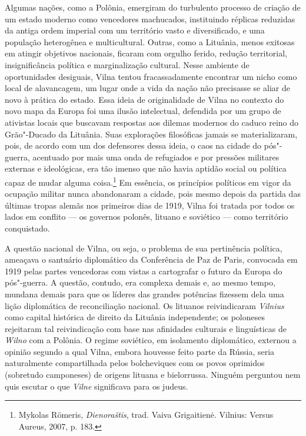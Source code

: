 Algumas nações, como a Polônia, emergiram do turbulento processo de
criação de um estado moderno como vencedores machucados, instituindo
réplicas reduzidas da antiga ordem imperial com um território vasto e
diversificado, e uma população heterogênea e multicultural. Outras, como
a Lituânia, menos exitosas em atingir objetivos nacionais, ficaram com
orgulho ferido, redução territorial, insignificância política e
marginalização cultural. Nesse ambiente de oportunidades desiguais,
Vilna tentou fracassadamente encontrar um nicho como local de
alavancagem, um lugar onde a vida da nação não precisasse se aliar de
novo à prática do estado. Essa ideia de originalidade de Vilna no
contexto do novo mapa da Europa foi uma ilusão intelectual, defendida
por um grupo de ativistas locais que buscavam respostas aos dilemas
modernos do caduco reino do Grão"-Ducado da Lituânia. Suas explorações
filosóficas jamais se materializaram, pois, de acordo com um dos
defensores dessa ideia, o caos na cidade do pós"-guerra, acentuado por
mais uma onda de refugiados e por pressões militares externas e
ideológicas, era tão imenso que não havia aptidão social ou política
capaz de mudar alguma coisa.\footnote{Mykolas Römeris, \textit{Dienoraštis}, trad. Vaiva Grigaitienė. Vilnius: Versus Aureus, 2007, p. 183.} Em essência, os princípios políticos em vigor da ocupação militar nunca abandonaram a cidade, pois mesmo depois da
partida das últimas tropas alemãs nos primeiros dias de 1919, Vilna foi
tratada por todos os lados em conflito --- os governos polonês, lituano e
soviético --- como território conquistado.

A questão nacional de Vilna, ou seja, o problema de sua pertinência
política, ameaçava o santuário diplomático da Conferência de Paz de
Paris, convocada em 1919 pelas partes vencedoras com vistas a
cartografar o futuro da Europa do pós"-guerra. A questão, contudo, era
complexa demais e, ao mesmo tempo, mundana demais para que os líderes
das grandes potências fizessem dela uma lição diplomática de
reconciliação nacional. Os lituanos reivindicaram \textit{Vilnius} como capital
histórica de direito da Lituânia independente; os poloneses rejeitaram
tal reivindicação com base nas afinidades culturais e linguísticas de
\textit{Wilno} com a Polônia. O regime soviético, em isolamento diplomático,
externou a opinião segundo a qual Vilna, embora houvesse feito parte da
Rússia, seria naturalmente compartilhada pelos bolcheviques com os povos
oprimidos (sobretudo camponeses) de origens lituana e bielorrussa. Ninguém
perguntou nem quis escutar o que \textit{Vilne} significava para os judeus.

